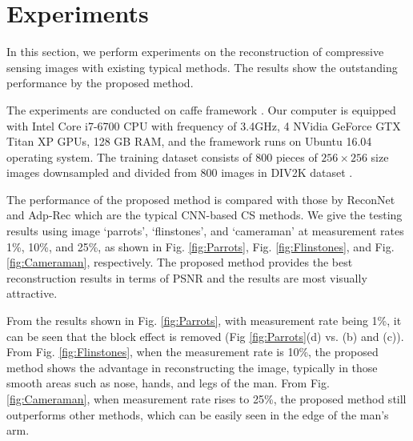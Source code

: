 \documentclass[review]{elsarticle}
\begin{document}
\section{Experiments}\label{section4}
In this section, we perform experiments on the reconstruction of compressive sensing images with existing typical methods. The results show the outstanding performance by the proposed method.

The experiments are conducted on caffe framework \cite{jia2014caffe}. Our computer is equipped with Intel Core i7-6700 CPU with frequency of 3.4GHz, 4 NVidia GeForce GTX Titan XP GPUs, 128 GB RAM, and the framework runs on Ubuntu 16.04 operating system. The training dataset consists of 800 pieces of $256\times256$ size images downsampled and divided from 800 images in DIV2K dataset \cite{timofte2017ntire}.

The performance of the proposed method is compared with those by ReconNet and Adp-Rec which are the typical CNN-based CS methods. We give the testing results using image `parrots', `flinstones', and `cameraman' at measurement rates 1\%, 10\%, and 25\%, as shown in Fig. \ref{fig:Parrots}, Fig. \ref{fig:Flinstones}, and Fig. \ref{fig:Cameraman}, respectively. The proposed method provides the best reconstruction results in terms of PSNR and the results are most visually attractive.

From the results shown in Fig. \ref{fig:Parrots}, with measurement rate being 1\%, it can be seen that the block effect is removed (Fig \ref{fig:Parrots}(d) vs. (b) and (c)). From Fig. \ref{fig:Flinstones}, when the measurement rate is 10\%, the proposed method shows the advantage in reconstructing the image, typically in those smooth areas such as nose, hands, and legs of the man. From Fig. \ref{fig:Cameraman}, when measurement rate rises to 25\%, the proposed method still outperforms other methods, which can be easily seen in the edge of the man's arm.
\end{document}
